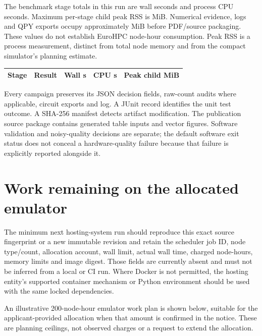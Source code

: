 \documentclass[11pt,a4paper]{article}
\begin{document}
The benchmark stage totals in this run are \SuiteWallSeconds{} wall
seconds and \SuiteCPUSeconds{} process CPU seconds. Maximum per-stage
child peak RSS is \SuitePeakMiB{} MiB. Numerical evidence, logs and QPY
exports occupy approximately \ArtifactMiB{} MiB before PDF/source
packaging. These values do not establish EuroHPC node-hour consumption.
Peak RSS is a process measurement, distinct from total node memory and
from the compact simulator's planning estimate.

\begin{center}\small
\begin{tabular}{lrrrr}\toprule
Stage & Result & Wall s & CPU s & Peak child MiB\\\midrule
 
\bottomrule\end{tabular}
\end{center}

Every campaign preserves its JSON decision fields, raw-count audits where
applicable, circuit exports and log. A JUnit record identifies the unit
test outcome. A SHA-256 manifest detects artifact modification. The
publication source package contains generated table inputs and vector
figures. Software validation and noisy-quality decisions are separate;
the default software exit status does not conceal a hardware-quality
failure because that failure is explicitly reported alongside it.

\section{Work remaining on the allocated emulator}
The minimum next hosting-system run should reproduce this exact source
fingerprint or a new immutable revision and retain the scheduler job ID,
node type/count, allocation account, wall limit, actual wall time, charged
node-hours, memory limits and image digest. Those fields are currently
absent and must not be inferred from a local or CI run. Where Docker is
not permitted, the hosting entity's supported container mechanism or
Python environment should be used with the same locked dependencies.

An illustrative 200-node-hour emulator work plan is shown below, suitable
for the applicant-provided allocation when that amount is confirmed in
the notice. These are planning ceilings, not observed charges or a request
to extend the allocation.
\end{document}
